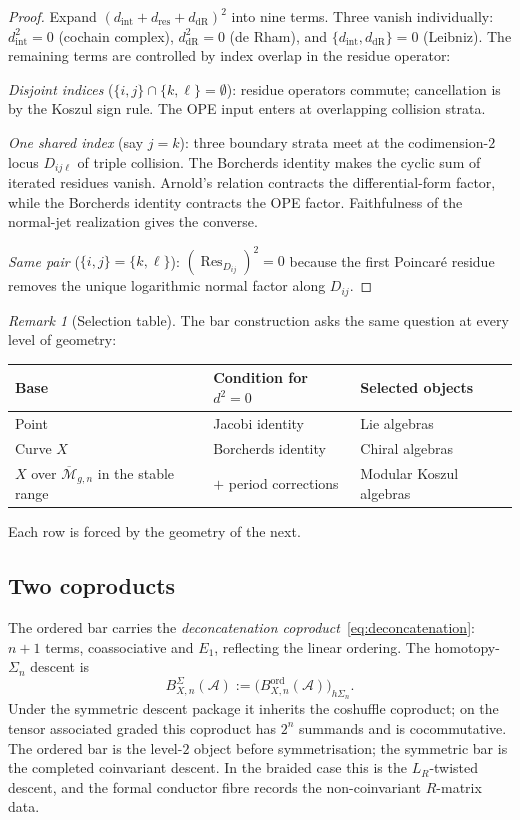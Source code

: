 \documentclass[11pt]{article}
\theoremstyle{plain}
\theoremstyle{definition}
\theoremstyle{remark}
\newtheorem{remark}[theorem]{Remark}
\newcommand{\Mbar}{\overline{\mathcal{M}}}
\newcommand{\cA}{\mathcal{A}}
\newcommand{\Res}{\operatorname{Res}}
\newcommand{\Eone}{E_1}
\begin{document}
\begin{proof}
Expand $(d_{\mathrm{int}} + d_{\mathrm{res}} + d_{\mathrm{dR}})^2$
into nine terms. Three vanish individually:
$d_{\mathrm{int}}^2 = 0$ (cochain complex),
$d_{\mathrm{dR}}^2 = 0$ (de Rham), and
$\{d_{\mathrm{int}}, d_{\mathrm{dR}}\} = 0$ (Leibniz). The
remaining terms are controlled by index overlap in the residue
operator:

\emph{Disjoint indices}
($\{i,j\} \cap \{k,\ell\} = \emptyset$): residue operators
commute; cancellation is by the Koszul sign rule.  The OPE input
enters at overlapping collision strata.

\emph{One shared index} (say $j = k$): three boundary strata meet
at the codimension-$2$ locus $D_{ij\ell}$ of triple collision.
The Borcherds identity makes the cyclic sum of iterated residues
vanish.  Arnold's relation contracts the differential-form factor,
while the Borcherds identity contracts the OPE factor.  Faithfulness
of the normal-jet realization gives the converse.

\emph{Same pair} ($\{i,j\} = \{k,\ell\}$):
$(\Res_{D_{ij}})^2 = 0$ because the first Poincar\'e residue removes
the unique logarithmic normal factor along \(D_{ij}\).
\end{proof}

\begin{remark}[Selection table]\label{rem:selection-table}
The bar construction asks the same question at every level
of geometry:
\begin{center}
\small
\begin{tabular}{lll}
\textbf{Base} & \textbf{Condition for $d^2 = 0$}
 & \textbf{Selected objects} \\
\hline
Point & Jacobi identity & Lie algebras \\
Curve $X$ & Borcherds identity & Chiral algebras \\
$X$ over $\Mbar_{g,n}$ in the stable range & $+$ period corrections
 & Modular Koszul algebras
\end{tabular}
\end{center}
Each row is forced by the geometry of the next.
\end{remark}

\subsection{Two coproducts}

The ordered bar carries the \emph{deconcatenation
coproduct}~\eqref{eq:deconcatenation}: $n+1$ terms, coassociative and
$\Eone$, reflecting the linear ordering. The homotopy-$\Sigma_n$
descent is
\[
 B^\Sigma_{X,n}(\cA)
 :=\bigl(B^{\mathrm{ord}}_{X,n}(\cA)\bigr)_{h\Sigma_n}.
\]
Under the symmetric descent package it inherits the coshuffle
coproduct; on the tensor associated graded this coproduct has $2^n$
summands and is cocommutative. The
ordered bar is the level-$2$ object before symmetrisation; the symmetric
bar is the completed coinvariant descent. In the braided case this is
the $L_R$-twisted descent, and the formal conductor fibre records the
non-coinvariant $R$-matrix data.
\end{document}
